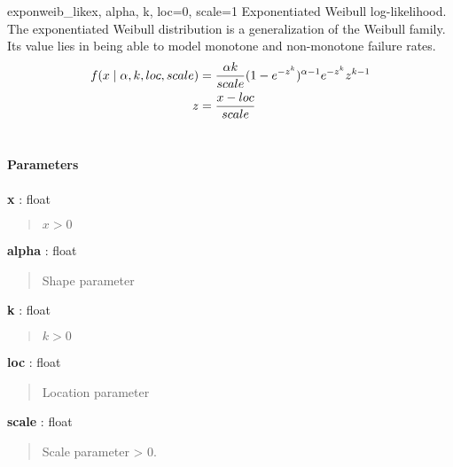 \hypertarget{pymc.distributions.exponweib_like}{}
\begin{funcdesc}{exponweib\_like}{x, alpha, k, loc=0, scale=1}
Exponentiated Weibull log-likelihood. The exponentiated Weibull distribution is a generalization of the Weibull
family. Its value lies in being able to model monotone and non-monotone
failure rates.
\begin{gather}
\begin{split}f(x \mid \alpha,k,loc,scale)  & = \frac{\alpha k}{scale} (1-e^{-z^k})^{\alpha-1} e^{-z^k} z^{k-1} \\
z & = \frac{x-loc}{scale}\end{split}\notag\\\begin{split}\end{split}\notag
\end{gather}\paragraph{Parameters}
\begin{paramlist}
\item[] \textbf{x} : float
\begin{quote}

$x>0$
\end{quote}

\item[] \textbf{alpha} : float
\begin{quote}

Shape parameter
\end{quote}

\item[] \textbf{k} : float
\begin{quote}

$k>0$
\end{quote}

\item[] \textbf{loc} : float
\begin{quote}

Location parameter
\end{quote}

\item[] \textbf{scale} : float
\begin{quote}

Scale parameter \textgreater{} 0.
\end{quote}
\end{paramlist}
\end{funcdesc}

